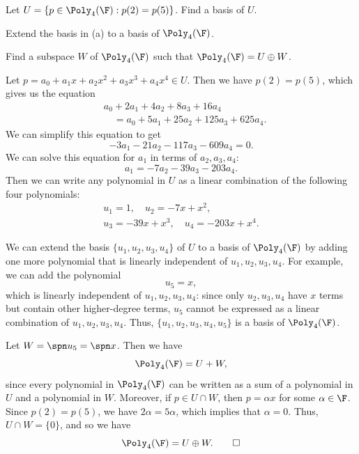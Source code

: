 \begin{exercise}\leavevmode
\begin{parts}
\item Let $U=\{p\in\Poly_4(\F) : p(2)=p(5)\}$. Find a basis of $U$.
\item Extend the basis in (a) to a basis of $\Poly_4(\F)$.
\item Find a subspace $W$ of $\Poly_4(\F)$ such that $\Poly_4(\F)=U\oplus W$.
\end{parts}
\end{exercise}
\begin{solution}
\begin{parts}
\item Let $p=a_0+a_1x+a_2x^2+a_3x^3+a_4x^4\in U$. Then we have $p(2)=p(5)$,
  which gives us the equation
  \begin{align*}
  &a_0+2a_1+4a_2+8a_3+16a_4\\
  &\quad= a_0+5a_1+25a_2+125a_3+625a_4.
  \end{align*}
  We can simplify this equation to get
  \[ -3a_1-21a_2-117a_3-609a_4 = 0. \]
  We can solve this equation for $a_1$ in terms of $a_2,a_3,a_4$:
  \[ a_1 = -7a_2-39a_3-203a_4. \]
  Then we can write any polynomial in $U$ as a linear combination of the
  following four polynomials:
  \begin{gather*}
  u_1=1, \quad u_2=-7x+x^2,\\
  u_3=-39x+x^3, \quad u_4=-203x+x^4.
  \end{gather*}
\item We can extend the basis $\{u_1,u_2,u_3,u_4\}$ of $U$ to a basis of
  $\Poly_4(\F)$ by adding one more polynomial that is linearly independent of
  $u_1,u_2,u_3,u_4$. For example, we can add the polynomial
  \[ u_5 = x, \]
  which is linearly independent of $u_1,u_2,u_3,u_4$: since only
  $u_2,u_3,u_4$ have $x$ terms but contain other higher-degree terms, $u_5$
  cannot be expressed as a linear combination of $u_1,u_2,u_3,u_4$. Thus,
  $\{u_1,u_2,u_3,u_4,u_5\}$ is a basis of $\Poly_4(\F)$.
\item Let $W=\spn u_5=\spn x$. Then we have
  \[ \Poly_4(\F) = U+W, \]
  since every polynomial in $\Poly_4(\F)$ can be written as a sum of a
  polynomial in $U$ and a polynomial in $W$. Moreover, if $p\in U\cap W$, then
  $p=\alpha x$ for some $\alpha\in\F$. Since $p(2)=p(5)$, we have
  $2\alpha=5\alpha$, which implies that $\alpha=0$. Thus, $U\cap W=\{0\}$, and
  so we have
  \[ \Poly_4(\F) = U\oplus W. \qedhere \]
\end{parts}
\end{solution}

